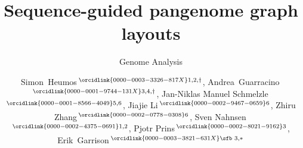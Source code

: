 \documentclass{bioinfo}
\theoremstyle{definition}
\begin{document}

    \subtitle{Genome Analysis}

	\title[Sequence-guided pangenome graph layouts]{Sequence-guided pangenome graph layouts}
    
	\author[Heumos, Guarracino \textit{et~al}.]{
        Simon~Heumos\,$^{\orcidlink{0000-0003-3326-817X}1,2,\dagger}$,
        Andrea~Guarracino\,$^{\orcidlink{0000-0001-9744-131X}3,4,\dagger}$,
        Jan-Niklas Manuel Schmelzle\,$^{\orcidlink{0000-0001-8566-4049}5,6}$,
        Jiajie Li\,$^{\orcidlink{0000-0002-9467-0659}6}$,
        Zhiru Zhang\,$^{\orcidlink{0000-0002-0778-0308}6}$,
        Sven Nahnsen\,$^{\orcidlink{0000-0002-4375-0691}1,2}$,
        Pjotr Prins\,$^{\orcidlink{0000-0002-8021-9162}3}$,
        Erik~Garrison\,$^{\orcidlink{0000-0003-3821-631X}\text{\sfb 3},*}$
    }

    \address{
        $^1$Quantitative Biology Center (QBiC), University of Tübingen, Tübingen 72076, Germany \\
        $^2$Biomedical Data Science, Department of Computer Science, University of Tübingen, Tübingen 72076, Germany \\
        $^3$Department of Genetics, Genomics and Informatics, University of Tennessee Health Science Center, Memphis, TN 38163, USA \\
        $^4$Genomics Research Centre, Human Technopole, Milan 20157, Italy \\
        $^5$Department of Computer Engineering, School of Computation, Information and Technology (CIT), Technical University of Munich, Munich 80333, Germany \\
        $^6$School of Electrical and Computer Engineering, Cornell University, Ithaca, NY 14853, USA \\
    }
\end{document}
